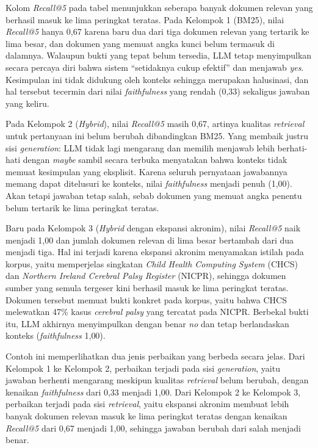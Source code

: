 Kolom \textit{Recall@5} pada tabel menunjukkan seberapa banyak dokumen relevan yang berhasil masuk ke lima peringkat teratas. Pada Kelompok 1 (BM25), nilai \textit{Recall@5} hanya 0{,}67 karena baru dua dari tiga dokumen relevan yang tertarik ke lima besar, dan dokumen yang memuat angka kunci belum termasuk di dalamnya. Walaupun bukti yang tepat belum tersedia, LLM tetap menyimpulkan secara percaya diri bahwa sistem ``setidaknya cukup efektif'' dan menjawab \textit{yes}. Kesimpulan ini tidak didukung oleh konteks sehingga merupakan halusinasi, dan hal tersebut tecermin dari nilai \textit{faithfulness} yang rendah (0{,}33) sekaligus jawaban yang keliru.

Pada Kelompok 2 (\textit{Hybrid}), nilai \textit{Recall@5} masih 0{,}67, artinya kualitas \textit{retrieval} untuk pertanyaan ini belum berubah dibandingkan BM25. Yang membaik justru sisi \textit{generation}: LLM tidak lagi mengarang dan memilih menjawab lebih berhati-hati dengan \textit{maybe} sambil secara terbuka menyatakan bahwa konteks tidak memuat kesimpulan yang eksplisit. Karena seluruh pernyataan jawabannya memang dapat ditelusuri ke konteks, nilai \textit{faithfulness} menjadi penuh (1{,}00). Akan tetapi jawaban tetap salah, sebab dokumen yang memuat angka penentu belum tertarik ke lima peringkat teratas.

Baru pada Kelompok 3 (\textit{Hybrid} dengan ekspansi akronim), nilai \textit{Recall@5} naik menjadi 1{,}00 dan jumlah dokumen relevan di lima besar bertambah dari dua menjadi tiga. Hal ini terjadi karena ekspansi akronim menyamakan istilah pada korpus, yaitu memperjelas singkatan \textit{Child Health Computing System} (CHCS) dan \textit{Northern Ireland Cerebral Palsy Register} (NICPR), sehingga dokumen sumber yang semula tergeser kini berhasil masuk ke lima peringkat teratas. Dokumen tersebut memuat bukti konkret pada korpus, yaitu bahwa CHCS melewatkan 47\% kasus \textit{cerebral palsy} yang tercatat pada NICPR. Berbekal bukti itu, LLM akhirnya menyimpulkan dengan benar \textit{no} dan tetap berlandaskan konteks (\textit{faithfulness} 1{,}00).

Contoh ini memperlihatkan dua jenis perbaikan yang berbeda secara jelas. Dari Kelompok 1 ke Kelompok 2, perbaikan terjadi pada sisi \textit{generation}, yaitu jawaban berhenti mengarang meskipun kualitas \textit{retrieval} belum berubah, dengan kenaikan \textit{faithfulness} dari 0{,}33 menjadi 1{,}00. Dari Kelompok 2 ke Kelompok 3, perbaikan terjadi pada sisi \textit{retrieval}, yaitu ekspansi akronim membuat lebih banyak dokumen relevan masuk ke lima peringkat teratas dengan kenaikan \textit{Recall@5} dari 0{,}67 menjadi 1{,}00, sehingga jawaban berubah dari salah menjadi benar.

